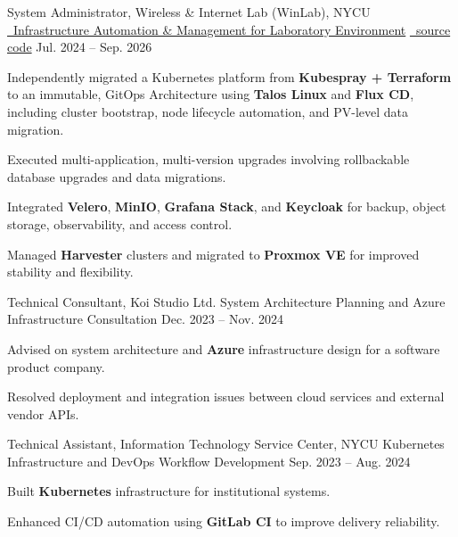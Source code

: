 \begin{cventries}
  \cventry
    {System Administrator, Wireless \& Internet Lab (WinLab), NYCU} %
    {\href{https://github.com/ChesterChuTw/winfra-cluster-management}
    {\faGithub\ Infrastructure Automation \& Management for Laboratory Environment}}
    {\href{https://github.com/ChesterChuTw/winfra-cluster-management}{\faGithub\ source code}} %
    {Jul. 2024 -- Sep. 2026} %
    {
      \begin{cvitems}
        \item {Independently migrated a Kubernetes platform from \textbf{Kubespray + Terraform} to an immutable, GitOps Architecture using \textbf{Talos Linux} and \textbf{Flux CD}, including cluster bootstrap, node lifecycle automation, and PV-level data migration.}
        \item {Executed multi-application, multi-version upgrades involving rollbackable database upgrades and data migrations.}
        \item {Integrated \textbf{Velero}, \textbf{MinIO}, \textbf{Grafana Stack}, and \textbf{Keycloak} for backup, object storage, observability, and access control.}
        \item {Managed \textbf{Harvester} clusters and migrated to \textbf{Proxmox VE} for improved stability and flexibility.}
      \end{cvitems}
    }

  \cventry
    {Technical Consultant, Koi Studio Ltd.} %
    {System Architecture Planning and Azure Infrastructure Consultation} %
    {} %
    {Dec. 2023 -- Nov. 2024} %
    {
      \begin{cvitems}
        \item {Advised on system architecture and \textbf{Azure} infrastructure design for a software product company.}
        \item {Resolved deployment and integration issues between cloud services and external vendor APIs.}
      \end{cvitems}
    }

  \cventry
    {Technical Assistant, Information Technology Service Center, NYCU} %
    {Kubernetes Infrastructure and DevOps Workflow Development} %
    {} %
    {Sep. 2023 -- Aug. 2024} %
    {
      \begin{cvitems}
        \item {Built \textbf{Kubernetes} infrastructure for institutional systems.}
        \item {Enhanced CI/CD automation using \textbf{GitLab CI} to improve delivery reliability.}
      \end{cvitems}
    }


\end{cventries}
